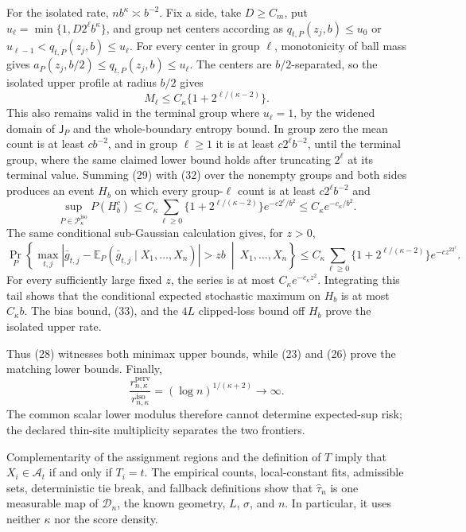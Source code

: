 For the isolated rate, \(nb^{\kappa}\asymp b^{-2}\).  Fix a side, take
\(D\ge C_m\), put \(u_\ell=\min\{1,D2^\ell b^\kappa\}\), and group net
centers according as \(q_{t,P}(z_j,b)\le u_0\) or
\(u_{\ell-1}<q_{t,P}(z_j,b)\le u_\ell\).  For every center in group
\(\ell\), monotonicity of ball mass gives
\(a_P(z_j,b/2)\le q_{t,P}(z_j,b)\le u_\ell\).  The centers are
\(b/2\)-separated, so the isolated upper profile at radius \(b/2\)
gives
\[
 M_\ell\le C_\kappa\{1+2^{\ell/(\kappa-2)}\}.
 \tag{32}
\]
This also remains valid in the terminal group where \(u_\ell=1\), by
the widened domain of \(\mathsf J_P\) and the whole-boundary entropy
bound.  In group zero the mean count is at least \(cb^{-2}\), and in
group \(\ell\ge1\) it is at least \(c2^\ell b^{-2}\), until the terminal
group, where the same claimed lower bound holds after truncating
\(2^\ell\) at its terminal value.  Summing (29) with (32) over the
nonempty groups and both sides produces an event \(H_b\) on which every
group-\(\ell\) count is at least \(c2^\ell b^{-2}\) and
\[
 \sup_{P\in\mathcal P_{\kappa}^{\mathrm{iso}}}P(H_b^c)
 \le C_\kappa\sum_{\ell\ge0}
 \{1+2^{\ell/(\kappa-2)}\}e^{-c2^\ell/b^2}
 \le C_\kappa e^{-c_\kappa/b^2}.
 \tag{33}
\]
The same conditional sub-Gaussian calculation gives, for \(z>0\),
\[
 \Pr_P\!\left\{
 \max_{t,j}|\bar g_{t,j}-\mathbb E_P(\bar g_{t,j}\mid X_1,\ldots,X_n)|
 >zb\ \middle|\ X_1,\ldots,X_n\right\}
 \le C_\kappa\sum_{\ell\ge0}
 \{1+2^{\ell/(\kappa-2)}\}e^{-cz^22^\ell}.
 \tag{34}
\]
For every sufficiently large fixed \(z\), the series is at most
\(C_\kappa e^{-c_\kappa z^2}\).  Integrating this tail shows that the
conditional expected stochastic maximum on \(H_b\) is at most
\(C_\kappa b\).  The bias bound, (33), and the \(4L\) clipped-loss bound
off \(H_b\) prove the isolated upper rate.

Thus (28) witnesses both minimax upper bounds, while (23) and (26) prove
the matching lower bounds.  Finally,
\[
 \frac{r_{n,\kappa}^{\mathrm{perv}}}{r_{n,\kappa}^{\mathrm{iso}}}
 =(\log n)^{1/(\kappa+2)}\longrightarrow\infty.
\]
The common scalar lower modulus therefore cannot determine expected-sup
risk; the declared thin-site multiplicity separates the two frontiers.

Complementarity of the assignment regions and the definition of \(T\)
imply that \(X_i\in\mathcal A_t\) if and only if \(T_i=t\).  The empirical
counts, local-constant fits, admissible sets, deterministic tie break, and
fallback definitions show that \(\widehat\tau_n\) is one measurable map
of \(\mathcal D_n\), the known geometry, \(L\), \(\sigma\), and \(n\).
In particular, it uses neither \(\kappa\) nor the score density.

